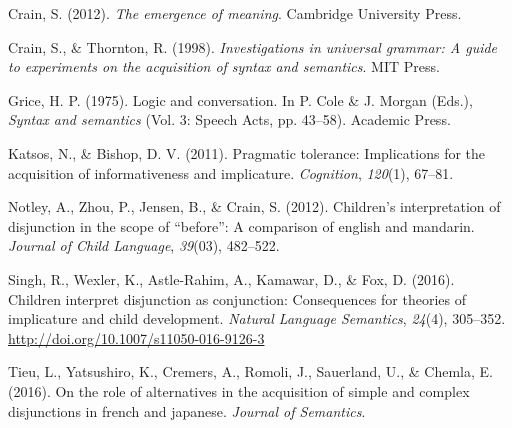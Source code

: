 \documentclass[10pt, letterpaper]{article}
\begin{document}
\hypertarget{ref-crain2012emergence}{}
Crain, S. (2012). \emph{The emergence of meaning}. Cambridge University
Press.

\hypertarget{ref-crain1998investigations}{}
Crain, S., \& Thornton, R. (1998). \emph{Investigations in universal
grammar: A guide to experiments on the acquisition of syntax and
semantics}. MIT Press.

\hypertarget{ref-grice1975logicconvo}{}
Grice, H. P. (1975). Logic and conversation. In P. Cole \& J. Morgan
(Eds.), \emph{Syntax and semantics} (Vol. 3: Speech Acts, pp. 43--58).
Academic Press.

\hypertarget{ref-katsos2011pragmatic}{}
Katsos, N., \& Bishop, D. V. (2011). Pragmatic tolerance: Implications
for the acquisition of informativeness and implicature.
\emph{Cognition}, \emph{120}(1), 67--81.

\hypertarget{ref-notley2012children}{}
Notley, A., Zhou, P., Jensen, B., \& Crain, S. (2012). Children's
interpretation of disjunction in the scope of ``before'': A comparison
of english and mandarin. \emph{Journal of Child Language},
\emph{39}(03), 482--522.

\hypertarget{ref-Singh2016}{}
Singh, R., Wexler, K., Astle-Rahim, A., Kamawar, D., \& Fox, D. (2016).
Children interpret disjunction as conjunction: Consequences for theories
of implicature and child development. \emph{Natural Language Semantics},
\emph{24}(4), 305--352. \url{http://doi.org/10.1007/s11050-016-9126-3}

\hypertarget{ref-tieu2016}{}
Tieu, L., Yatsushiro, K., Cremers, A., Romoli, J., Sauerland, U., \&
Chemla, E. (2016). On the role of alternatives in the acquisition of
simple and complex disjunctions in french and japanese. \emph{Journal of
Semantics}.
\end{document}
